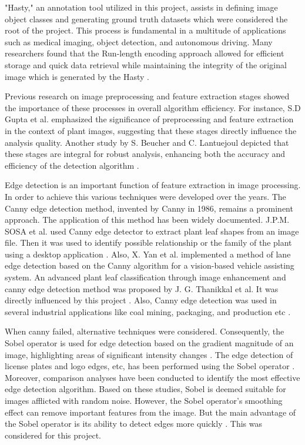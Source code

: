 \documentclass[]{iat}
\begin{document}
\par
"Hasty," an annotation tool utilized in this project, assists in defining image object classes and generating ground truth datasets which were considered the root of the project\cite{CloudFactory}. This process is fundamental in a multitude of applications such as medical imaging, object detection, and autonomous driving. Many researchers found that the Run-length encoding approach allowed for efficient storage and quick data retrieval while maintaining the integrity of the original image which is generated by the Hasty \cite{samet1984,li2018}.
\par
Previous research on image preprocessing and feature extraction stages showed the importance of these processes in overall algorithm efficiency. For instance, S.D Gupta et al. emphasized the significance of preprocessing and feature extraction in the context of plant images, suggesting that these stages directly influence the analysis quality\cite{gupta2015}. Another study by S. Beucher and C. Lantuejoul depicted that these stages are integral for robust analysis, enhancing both the accuracy and efficiency of the detection algorithm \cite{beucher1979}.
\par
Edge detection is an important function of feature extraction in image processing. In order to achieve this various techniques were developed over the years. The Canny edge detection method, invented by Canny in 1986, remains a prominent approach\cite{Canny1986}. The application of this method has been widely documented. J.P.M. SOSA et al. used Canny edge detector to extract plant leaf shapes from an image file. Then it was used to identify possible relationship or the family of the plant using a desktop application \cite{inproceedings}. Also, X. Yan et al. implemented a method of lane edge detection based on the Canny algorithm for a vision-based vehicle assisting system. An advanced plant leaf classification through image enhancement and canny edge detection method was proposed by J. G. Thanikkal et al. It was directly influenced by this project \cite{8748587}. Also, Canny edge detection was used in several industrial applications like coal mining, packaging, and production etc \cite{8243122, 9853348, beeran2014evaluation}.
\par
When canny failed, alternative techniques were considered. Consequently, the Sobel operator is used for edge detection based on the gradient magnitude of an image, highlighting areas of significant intensity changes \cite{duda2000pattern}. The edge detection of license plates and logo edges, etc, has been performed using the Sobel operator \cite{7755367,beeran2014evaluation}. Moreover, comparison analyses have been conducted to identify the most effective edge detection algorithm. Based on these studies, Sobel is deemed suitable for images afflicted with random noise. However, the Sobel operator's smoothing effect can remove important features from the image. But the main advantage of the Sobel operator is its ability to detect edges more quickly \cite{7938931,9232632}. This was considered for this project. 
\end{document}
